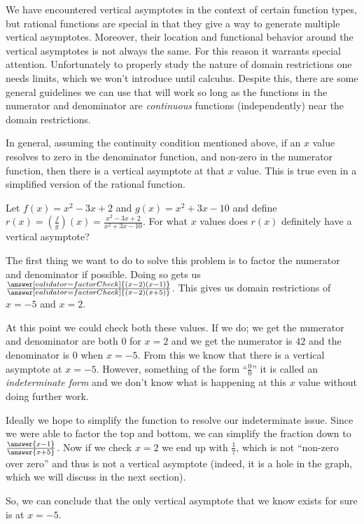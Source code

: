 \documentclass{ximera}
\begin{document}
We have encountered vertical asymptotes in the context of certain function types, but rational functions are special in that they give a way to generate multiple vertical asymptotes. Moreover, their location and functional behavior around the vertical asymptotes is not always the same. For this reason it warrants special attention. Unfortunately to properly study the nature of domain restrictions one needs limits, which we won't introduce until calculus. Despite this, there are some general guidelines we can use that will work so long as the functions in the numerator and denominator are \textit{continuous} functions (independently) near the domain restrictions.

In general, assuming the continuity condition mentioned above, if an $x$ value resolves to zero in the denominator function, and non-zero in the numerator function, then there is a vertical asymptote at that $x$ value. This is true even in a simplified version of the rational function.

\begin{example}
    Let $f(x) = x^2 - 3x + 2$ and $g(x) = x^2 + 3x - 10$ and define $r(x) = \left(\frac{f}{g}\right)(x) = \frac{x^2 - 3x + 2}{x^2 + 3x - 10}$. For what $x$ values does $r(x)$ definitely have a vertical asymptote?
    
    The first thing we want to do to solve this problem is to factor the numerator and denominator if possible. Doing so gets us $\frac{\answer[validator=factorCheck]{(x-2)(x-1)}}{\answer[validator=factorCheck]{(x-2)(x+5)}}$. This gives us domain restrictions of $x = -5$ and $x = 2$. 
    
    At this point we could check both these values. If we do; we get the numerator and denominator are both $0$ for $x=2$ and we get the numerator is $42$ and the denominator is $0$ when $x = -5$. From this we know that there is a vertical asymptote at $x=-5$. However, something of the form ``$\frac{0}{0}$'' it is called an \textit{indeterminate form} and we don't know what is happening at this $x$ value without doing further work. 
    
    Ideally we hope to simplify the function to resolve our indeterminate issue. Since we were able to factor the top and bottom, we can simplify the fraction down to $\frac{\answer{x-1}}{\answer{x+5}}$. Now if we check $x=2$ we end up with $\frac{1}{7}$, which is not ``non-zero over zero'' and thus is not a vertical asymptote (indeed, it is a hole in the graph, which we will discuss in the next section).
    
    So, we can conclude that the only vertical asymptote that we know exists for sure is at $x=-5$.
\end{example}
\end{document}
